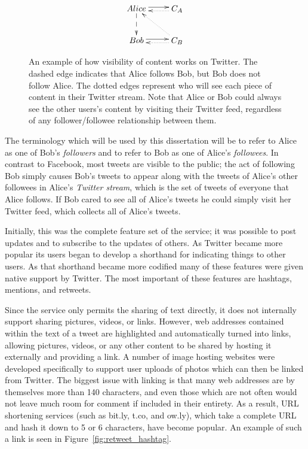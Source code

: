 \begin{figure}
  \centering
\begin{displaymath}
  \xymatrix{
    Alice \ar@<0.5ex>[r] \ar@{-->}[d] & C_{A} \ar@{.>}@<0.5ex>[l] \\
    Bob   \ar@<0.5ex>[r] & C_{B} \ar@{.>}@<0.5ex>[l] \ar@{.>}[ul] }
\end{displaymath} 
  \caption[Visibility of content on Twitter]{An example of how visibility of content works on Twitter. The dashed edge indicates that Alice follows Bob, but Bob does not follow Alice. The dotted edges represent who will see each piece of content in their Twitter stream. Note that Alice or Bob could always see the other users's content by visiting their Twitter feed, regardless of any follower/followee relationship between them.}
\label{fig:twitter_content_visibility}
\end{figure}

The terminology which will be used by this dissertation will be to refer to Alice as one of Bob's \emph{followers} and to refer to Bob as one of Alice's \emph{followees}. In contrast to Facebook, most tweets are visible to the public; the act of following Bob simply causes Bob's tweets to appear along with the tweets of Alice's other followees in Alice's \emph{Twitter stream}, which is the set of tweets of everyone that Alice follows. If Bob cared to see all of Alice's tweets he could simply visit her Twitter feed, which collects all of Alice's tweets.

Initially, this was the complete feature set of the service; it was possible to post updates and to subscribe to the updates of others. As Twitter became more popular its users began to develop a shorthand for indicating things to other users. As that shorthand became more codified many of these features were given native support by Twitter. The most important of these features are hashtags, mentions, and retweets.

Since the service only permits the sharing of text directly, it does not internally support sharing pictures, videos, or links. However, web addresses contained within the text of a tweet are highlighted and automatically turned into links, allowing pictures, videos, or any other content to be shared by hosting it externally and providing a link. A number of image hosting websites were developed specifically to support user uploads of photos which can then be linked from Twitter. The biggest issue with linking is that many web addresses are by themselves more than 140 characters, and even those which are not often would not leave much room for comment if included in their entirety. As a result, URL shortening services (such as bit.ly, t.co, and ow.ly), which take a complete URL and hash it down to 5 or 6 characters, have become popular. An example of such a link is seen in Figure~\ref{fig:retweet_hashtag}.


